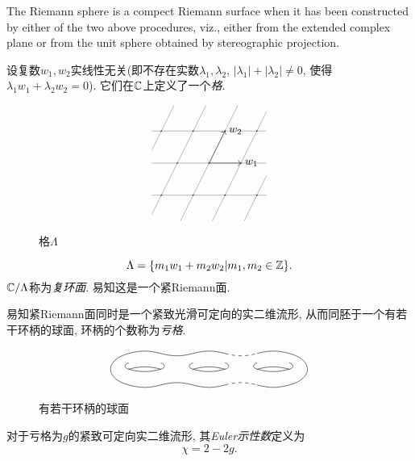 \begin{example}[The set of extended complex numbers $\Sigma=\C\cup\{\infty\}$ (one point compactification of complex numbers)]
    The Riemann sphere is a compect Riemann surface when it has been constructed by either of the two above procedures, viz., either from the extended complex plane or from the unit sphere obtained by stereographic projection. 
\end{example}
\begin{example}
    设复数$w_1,w_2$实线性无关(即不存在实数$\lambda_1,\lambda_2$, $|\lambda_1|+|\lambda_2|\neq0$, 使得$\lambda_1w_1+\lambda_2w_2=0$). 它们在$\mathbb{C}$上定义了一个\textit{格}. 
    \begin{figure}[h]
        \[\begin{tikzpicture}[cm={1,0,.5,1,(0,0)}]
            \clip[cm={1,0,-.5,1,(0,0)}](-1.8,-1.8)rectangle(1.8,1.8);
            \draw[->](0,0)--(1,0)node[right]{$w_1$};
            \draw[->](0,0)--(0,1)node[right]{$w_2$};
            \draw[thin,gray](-5,-5)grid(5,5);
            \foreach\x in{-5,...,5}
            \foreach\y in{-5,...,5}
                \fill(\x,\y)circle[radius=.02];
        \end{tikzpicture}\]
        \caption{格$\Lambda$}
    \end{figure}
    \[\Lambda=\{m_1w_1+m_2w_2|m_1,m_2\in\mathbb{Z}\}. \]
    $\mathbb{C}/\Lambda$称为\textit{复环面}. 易知这是一个紧Riemann面. 
\end{example}

易知紧Riemann面同时是一个紧致光滑可定向的实二维流形, 从而同胚于一个有若干环柄的球面, 环柄的个数称为\textit{亏格}. 
\begin{figure}
    \[\begin{tikzpicture}
        \draw(0,.5)to[out=15,in=165](1,.5)
        to[out=-15,in=-165](2,.5)
        to[out=15,in=165](3,.5);
        \draw(0,.5)to[out=-165,in=165,looseness=2](0,-.5);
        \draw(0,-.5)to[out=-15,in=-165](1,-.5)
        to[out=15,in=165](2,-.5)
        to[out=-15,in=-165](3,-.5);

        \draw[dashed](3,.5)to[out=-15,in=-165](4,.5);
        \draw[dashed](3,-.5)to[out=15,in=165](4,.-.5);

        \draw(4,.5)to[out=15,in=165](5,.5);
        \draw(5,.5)to[out=-15,in=15,looseness=2](5,-.5);
        \draw(4,-.5)to[out=-15,in=-165](5,-.5);

        \draw(0,.2)to[looseness=2,out=-165,in=165](0,0)to[out=-15,in=-165](1,0)to[looseness=2,out=15,in=-15](1,.2);
        \draw(0,0)to[out=15,in=165](1,0);

        \draw(2,.2)to[looseness=2,out=-165,in=165](2,0)to[out=-15,in=-165](3,0)to[looseness=2,out=15,in=-15](3,.2);
        \draw(2,0)to[out=15,in=165](3,0);

        \draw(4,.2)to[looseness=2,out=-165,in=165](4,0)to[out=-15,in=-165](5,0)to[looseness=2,out=15,in=-15](5,.2);
        \draw(4,0)to[out=15,in=165](5,0);
    \end{tikzpicture}\]
    \caption{有若干环柄的球面}
\end{figure}
\begin{definition}
    对于亏格为$g$的紧致可定向实二维流形, 其\textit{Euler示性数}定义为
    \[\chi=2-2g. \]
\end{definition}

